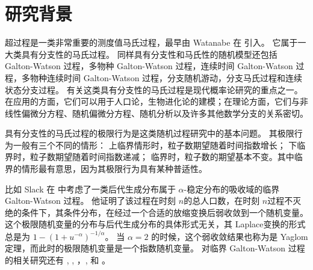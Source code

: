 \documentclass[12pt,a4paper]{article}
\theoremstyle{plain}
\theoremstyle{definition}
\numberwithin{equation}{section}
\begin{document}
\begin{comment}
\title
    [选题报告]
    {\large 博士论文选题报告：临界马氏分支过程的脊柱分解和极限定理}
\author
    [孙振尧]
    {孙振尧}
\address
    {孙振尧\\
    数学科学学院\\
    北京大学\\
    北京, 100871}
\email{zhenyao.sun@pku.edu.cn}
\thanks{博士生导师：任艳霞教授（北京大学）。}
\thanks{联合培养导师：Prof. Renming Song（伊利诺伊大学香槟分校）。}
\thanks{2018年6月1日}
\maketitle
\end{comment}

\section{研究背景}

	超过程是一类非常重要的测度值马氏过程，最早由 Watanabe 在 \cite{Watanabe1968A-limit} 引入。
	它属于一大类具有分支性的马氏过程。
	同样具有分支性和马氏性的随机模型还包括 Galton-Watson 过程，多物种 Galton-Watson 过程，连续时间 Galton-Watson 过程，多物种连续时间 Galton-Watson 过程，分支随机游动，分支马氏过程和连续状态分支过程。
	有关这类具有分支性的马氏过程是现代概率论研究的重点之一。
	在应用的方面，它们可以用于人口论，生物进化论的建模；在理论方面，它们与非线性偏微分方程、随机偏微分方程、随机分析以及许多其他数学分支的关系密切。

	具有分支性的马氏过程的极限行为是这类随机过程研究中的基本问题。
	其极限行为一般有三个不同的情形：
	上临界情形时，粒子数期望随着时间指数增长；
	下临界时，粒子数期望随着时间指数递减；
	临界时，粒子数的期望基本不变。其中临界的情形最有意思，因为其极限行为具有某种普适性。

	比如 Slack 在 \cite{Slack1968A-branching} 中考虑了一类后代生成分布属于 $\alpha​$-稳定分布的吸收域的临界 Galton-Watson 过程。
	他证明了该过程在时刻 $n​$的总人口数，在时刻 $n​$过程不灭绝的条件下，其条件分布，在经过一个合适的放缩变换后弱收敛到一个随机变量。
	这个极限随机变量的分布与后代生成分布的具体形式无关，其 Laplace变换的形式总是为 $1- (1+u^{-\alpha})^{-1/\alpha}​$。
	当 $\alpha = 2​$ 的时候，这个弱收敛结果也称为是 Yaglom 定理，而此时的极限随机变量是一个指数随机变量。
	对临界 Galton-Watson 过程的相关研究还有 \cite{Kolmogorov1938Zur-losung}, \cite{Yaglom1947Certain}, \cite{KestenNeySpitzer1966The-Galton-Watson}，\cite{LyonsPemantlePeres1995Conceptual}, \cite{Geiger1999Elementary} 和 \cite{Geiger2000A-new}。
\end{document}
